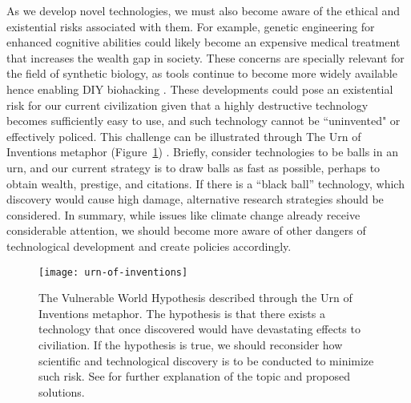 As we develop novel technologies, we must also become aware of the ethical and existential risks associated with them.
For example, genetic engineering for enhanced cognitive abilities could likely become an expensive medical treatment that increases the wealth gap in society.
These concerns are specially relevant for the field of synthetic biology, as tools continue to become more widely available hence enabling DIY biohacking \citep{bennett2009}.
These developments could pose an existential risk for our current civilization given that a highly destructive technology becomes sufficiently easy to use,  and such technology cannot be ``uninvented" or effectively policed.
This challenge can be illustrated through The Urn of Inventions metaphor (Figure~\ref{fig8:vwh}) \citep{bostrom2019}. %
Briefly, consider technologies to be balls in an urn, and our current strategy is to draw balls as fast as possible, perhaps to obtain wealth, prestige, and citations.
If there is a ``black ball'' technology, which discovery would cause high damage, alternative research strategies should be considered.
In summary, while issues like climate change already receive considerable attention, we should become more aware of other dangers of technological development and create policies accordingly.

\begin{figure}[h]
  \centering
  \texttt{[image: urn-of-inventions]}
    \caption[The Vulnerable World Hypothesis]{The Vulnerable World Hypothesis described through the Urn of Inventions metaphor. The hypothesis is that there exists a technology that once discovered would have devastating effects to civiliation. If the hypothesis is true, we should reconsider how scientific and technological discovery is to be conducted to minimize such risk. See \citep{bostrom2019} for further explanation of the topic and proposed solutions.}
    \label{fig8:vwh}
\end{figure}
